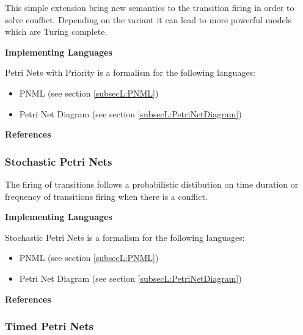 This simple extension bring new semantics to the transition firing in order to solve conflict. Depending on the variant it can lead to more powerful models which are Turing complete.

\textbf{Implementing Languages}

Petri Nets with Priority is a formalism for the following languages:
\begin{itemize}
	\item PNML (see section \ref{subsecL:PNML})
	\item Petri Net Diagram (see section \ref{subsecL:PetriNetDiagram})
\end{itemize}





\textbf{References}




\subsubsection{Stochastic Petri Nets}
\label{subsecF:PetriNetsStochastic}


The firing of transitions follows a probabilistic distibution on time duration or frequency of transitions firing when there is a conflict.

\textbf{Implementing Languages}

Stochastic Petri Nets is a formalism for the following languages:
\begin{itemize}
	\item PNML (see section \ref{subsecL:PNML})
	\item Petri Net Diagram (see section \ref{subsecL:PetriNetDiagram})
\end{itemize}





\textbf{References}




\subsubsection{Timed Petri Nets}
\label{subsecF:PetriNetsTimed}


